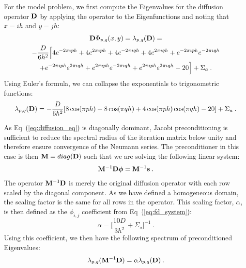\documentclass{mc2013}
\begin{document}
For the model problem, we first compute the Eigenvalues for the
diffusion operator $\mathbf{D}$ by applying the operator to the
Eigenfunctions and noting that $x=ih$ and $y=jh$:
\begin{multline}
  \mathbf{D}\Phi_{p,q}(x,y) = \lambda_{p,q}(\mathbf{D})
  =\\ -\frac{D}{6h^2}\Big[4 e^{-2 \pi \imath p h} + 4 e^{2 \pi \imath
      p h} + 4 e^{-2 \pi \imath q h} + 4 e^{2 \pi \imath q h} + e^{-2
      \pi \imath p h} e^{-2 \pi \imath q h} \\ + e^{-2 \pi \imath p h}
    e^{2 \pi \imath q h} + e^{2 \pi \imath p h} e^{-2 \pi \imath q h}
    + e^{2 \pi \imath p h} e^{2 \pi \imath q h} - 20\Big] + \Sigma_a
  \:.
  \label{eq:deriv_diff_1}
\end{multline}
Using Euler's formula, we can collapse the exponentials to
trigonometric functions:
\begin{equation}
  \lambda_{p,q}(\mathbf{D}) = -\frac{D}{6h^2}[ 8 \cos(\pi p h) + 8
    \cos(\pi q h) + 4 \cos(\pi p h) \cos(\pi q h) - 20] + \Sigma_a\:.
  \label{eq:deriv_diff_2}
\end{equation}

As Eq~(\ref{eq:diffusion_eq}) is diagonally dominant, Jacobi
preconditioning is sufficient to reduce the spectral radius of the
iteration matrix below unity and therefore ensure convergence of the
Neumann series. The preconditioner in this case is then $\mathbf{M} =
diag(\mathbf{D})$ such that we are solving the following linear system:
\begin{equation}
  \mathbf{M}^{-1} \mathbf{D} \boldsymbol{\phi} = \mathbf{M}^{-1} \mathbf{s}\:.
  \label{eq:precond_diffsion}
\end{equation}
The operator $\mathbf{M}^{-1} \mathbf{D}$ is merely the original diffusion
operator with each row scaled by the diagonal component. As we have
defined a homogeneous domain, the scaling factor is the same for all
rows in the operator. This scaling factor, $\alpha$, is then defined
as the $\phi_{i,j}$ coefficient from Eq~(\ref{eq:fd_system}):
\begin{equation}
  \alpha = \Bigg[\frac{10 D}{3 h^2} + \Sigma_a\Bigg]^{-1}\:.
  \label{eq:jacobi_scaling}
\end{equation}
Using this coefficient, we then have the following spectrum of
preconditioned Eigenvalues:
\begin{equation}
  \lambda_{p,q}(\mathbf{M}^{-1} \mathbf{D}) = \alpha \lambda_{p,q}(\mathbf{D})\:.
  \label{eq:preconditioned_Eigenvalues}
\end{equation}
\end{document}
